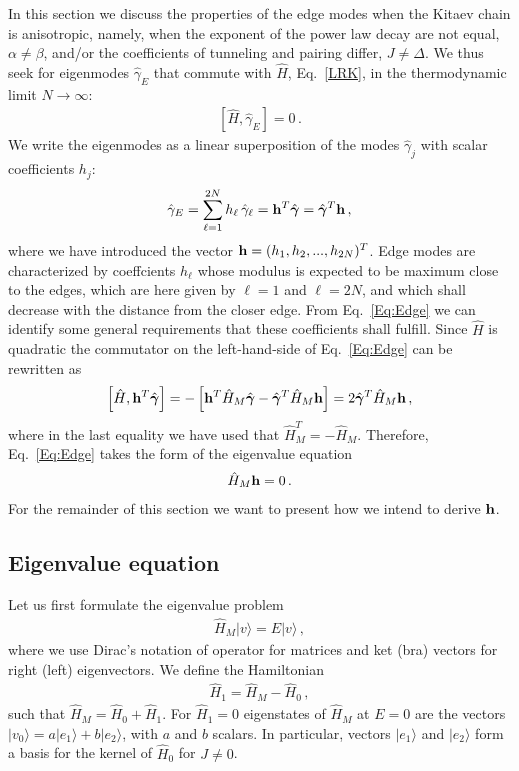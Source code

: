 \documentclass[pra,twocolumn,
superscriptaddress,
showpacs,
aps
]{revtex4-1}
\begin{document}
In this section we discuss the properties of the edge modes when the Kitaev chain is anisotropic, namely, when the exponent of the power law decay are not equal, $\alpha\neq \beta$, and/or the coefficients of tunneling and pairing differ, $J\neq \Delta$. We thus seek for eigenmodes $\hat\gamma_E$ that commute with $\hat{H}$, Eq.~\eqref{LRK}, in the thermodynamic limit $N\to\infty$:
\begin{align}
\label{Eq:Edge}
\left[\hat{H},\hat\gamma_E\right]=0\,.
\end{align}
We write the eigenmodes as a linear superposition of the modes $\hat\gamma_j$ with scalar coefficients $h_j$:
\begin{equation}
\hat\gamma_E=\sum_{\ell=1}^{2N}h_\ell\,\hat\gamma_\ell={\bf h}^T\hat{\boldsymbol{\gamma}}=\hat{\boldsymbol{\gamma}}^T{\bf h}\,,
\end{equation}
where we have introduced the vector ${{\bf h}=(h_1,h_2,...,h_{2N})^T}$. Edge modes are characterized by coeffcients $h_\ell$ whose modulus is expected to be maximum close to the edges, which are here given by $\ell=1$ and $\ell=2N$, and which shall decrease with the distance from the closer edge. From Eq.~\eqref{Eq:Edge} we can identify some general requirements that these coefficients shall fulfill. Since $\hat{H}$ is quadratic the commutator on the left-hand-side of Eq.~\eqref{Eq:Edge} can be rewritten as
\begin{align}
\left[\hat{H},{\bf h}^T\hat{\boldsymbol{\gamma}}\right]=-\left[{\bf h}^T\hat{H}_{M}\hat{\boldsymbol{\gamma}}-\hat{\boldsymbol{\gamma}}^T\hat{H}_{M}{\bf h}\right]=2\hat{\boldsymbol{\gamma}}^T\hat{H}_{M}{\bf h}\,,
\end{align}
where in the last equality we have used  that $\hat{H}_{M}^T=-\hat{H}_{M}$. Therefore, Eq.~\eqref{Eq:Edge} takes the form of the eigenvalue equation
\begin{align}
\label{Eq:Edge:h}
\hat{H}_{M}{\bf h}=0\,.
\end{align}
For the remainder of this section we want to present how we intend to derive ${\bf h}$. 

\subsection{Eigenvalue equation}

Let us first formulate the eigenvalue problem
\begin{align}
\label{Eq:Edge:h:2}
\hat{H}_{M}|v\rangle=E|v\rangle\,,
\end{align}
where we use Dirac's notation of operator for matrices and ket (bra) vectors for right (left) eigenvectors. We define the Hamiltonian
\begin{align}
\hat{H}_1=\hat{H}_M-\hat{H}_0\,,
\end{align}
such that $\hat{H}_M=\hat{H}_0+\hat{H}_1$.  For $\hat{H}_1=0$ eigenstates of $\hat{H}_{M}$ at $E=0$ are the vectors $|v_0\rangle =a|e_1\rangle+b|e_2\rangle$, with $a$ and $b$ scalars. In particular, vectors $|e_1\rangle$ and $|e_2\rangle$ form a basis for the kernel of $\hat{H}_0$ for $J\neq0$. 
\end{document}
